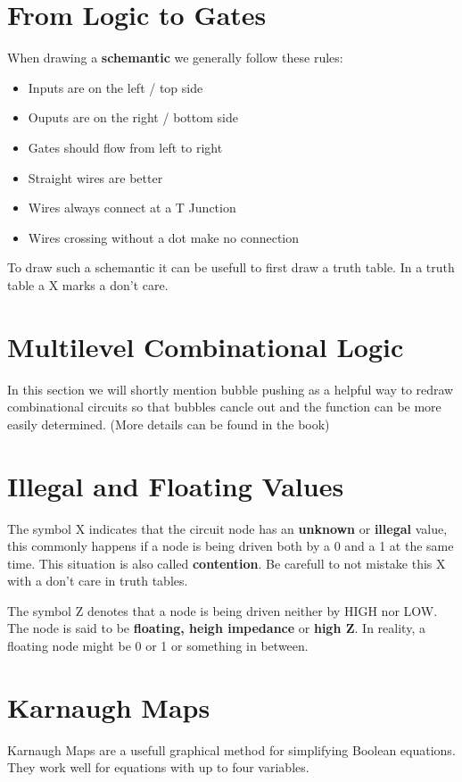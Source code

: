 \section{From Logic to Gates}
When drawing a \textbf{schemantic} we generally follow these rules:
\begin{itemize}
    \item Inputs are on the left / top side
    \item Ouputs are on the right / bottom side
    \item Gates should flow from left to right
    \item Straight wires are better
    \item Wires always connect at a T Junction
    \item Wires crossing without a dot make no connection
\end{itemize}
To draw such a schemantic it can be usefull to first draw a truth table. In a truth table a X marks 
a don't care.

\section{Multilevel Combinational Logic}
In this section we will shortly mention bubble pushing as a helpful way to redraw combinational 
circuits so that bubbles cancle out and the function can be more easily determined. (More details 
can be found in the book)

\section{Illegal and Floating Values}
The symbol X indicates that the circuit node has an \textbf{unknown} or \textbf{illegal} value, this 
commonly happens if a node is being driven both by a 0 and a 1 at the same time. This situation is 
also called \textbf{contention}. Be carefull to not mistake this X with a don't care in truth tables.

The symbol Z denotes that a node is being driven neither by HIGH nor LOW. The node is said to be 
\textbf{floating, heigh impedance} or \textbf{high Z}. In reality, a floating node might be 0 or 1 
or something in between.

\section{Karnaugh Maps}
Karnaugh Maps are a usefull graphical method for simplifying Boolean equations. They work well for 
equations with up to four variables. 

